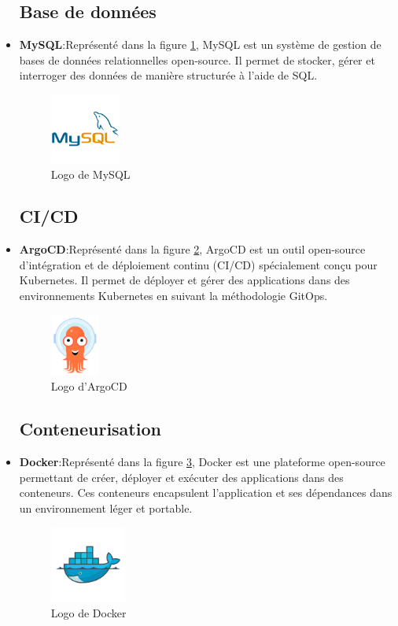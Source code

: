 \begin{itemize}
\subsection{Base de données}
\item \textbf{MySQL}:Représenté dans la figure \ref{fig:MySQL}, MySQL est un système de gestion de bases de données relationnelles open-source. Il permet de stocker, gérer et interroger des données de manière structurée à l'aide de SQL.
 \begin{figure}[h]
    \centering
    \includegraphics[width=2.3cm]{images/MySQL.png}
    \caption{Logo de MySQL}
    \label{fig:MySQL}
\end{figure}
\subsection{CI/CD}
\item \textbf{ArgoCD}:Représenté dans la figure \ref{fig:ArgoCD}, ArgoCD est un outil open-source d'intégration et de déploiement continu (CI/CD) spécialement conçu pour Kubernetes. Il permet de déployer et gérer des applications dans des environnements Kubernetes en suivant la méthodologie GitOps.
 \begin{figure}[h]
    \centering
    \includegraphics[width=1.6cm]{images/ArgoCD.png}
    \caption{Logo d'ArgoCD}
    \label{fig:ArgoCD}
\end{figure}
\subsection{Conteneurisation}
\item \textbf{Docker}:Représenté dans la figure \ref{fig:docker}, Docker est une plateforme open-source permettant de créer, déployer et exécuter des applications dans des conteneurs. Ces conteneurs encapsulent l’application et ses dépendances dans un environnement léger et portable.
 \begin{figure}[h]
    \centering
    \includegraphics[width=2.5cm]{images/docker.png}
    \caption{Logo de Docker}
    \label{fig:docker}
\end{figure}
\newpage

\end{itemize}
